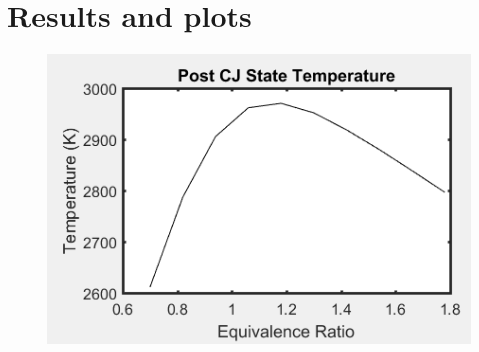 \documentclass[11pt]{article}
\begin{document}
\section{Results and plots}

\begin{figure} [H]
	\begin{center}
\includegraphics[height=0.5\textwidth]{P1}
    \end{center}
\end{figure}
\end{document}
